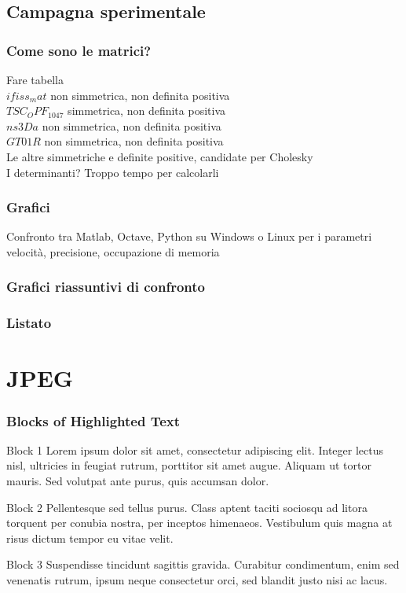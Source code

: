 \documentclass{beamer}
\begin{document}
\subsection{Campagna sperimentale}

\frametitle{Come sono le matrici?}
\begin{frame}
Fare tabella\\
$ifiss_mat$ non simmetrica, non definita positiva\\
$TSC_OPF_1047$ simmetrica, non definita positiva\\
$ns3Da$ non simmetrica, non definita positiva\\
$GT01R$ non simmetrica, non definita positiva\\
Le altre simmetriche e definite positive, candidate per Cholesky\\
I determinanti? Troppo tempo per calcolarli
\end{frame}

\frametitle{Grafici}
\begin{frame}
Confronto tra Matlab,  Octave, Python su Windows o Linux per i parametri velocità, precisione, occupazione di memoria
\end{frame}

\frametitle{Grafici riassuntivi di confronto}
\begin{frame}

\end{frame}

\frametitle{Listato}
\begin{frame}

\end{frame}

\section{JPEG}



\begin{frame}
\frametitle{Blocks of Highlighted Text}
\begin{block}{Block 1}
Lorem ipsum dolor sit amet, consectetur adipiscing elit. Integer lectus nisl, ultricies in feugiat rutrum, porttitor sit amet augue. Aliquam ut tortor mauris. Sed volutpat ante purus, quis accumsan dolor.
\end{block}

\begin{block}{Block 2}
Pellentesque sed tellus purus. Class aptent taciti sociosqu ad litora torquent per conubia nostra, per inceptos himenaeos. Vestibulum quis magna at risus dictum tempor eu vitae velit.
\end{block}

\begin{block}{Block 3}
Suspendisse tincidunt sagittis gravida. Curabitur condimentum, enim sed venenatis rutrum, ipsum neque consectetur orci, sed blandit justo nisi ac lacus.
\end{block}
\end{frame}
\end{document}
